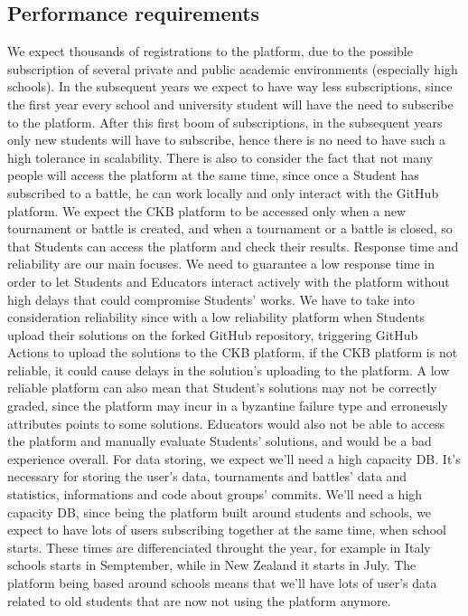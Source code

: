 \documentclass{article}
\begin{document}
{\subsection{Performance requirements}
We expect thousands of registrations to the platform, due to the possible
subscription of several private and public academic environments (especially high schools).
In the subsequent years we expect to have way less subscriptions, since the first year every school and university student
will have the need to subscribe to the platform.
After this first boom of subscriptions, in the subsequent years only new students will have to subscribe, hence there is no need to 
have such a high tolerance in scalability.
There is also to consider the fact that not many people will access the platform at the same time, since once a Student has subscribed 
to a battle, he can work locally and only interact with the GitHub platform.
We expect the CKB platform to be accessed only when a new tournament or battle is created, and when a tournament or a battle is closed,
so that Students can access the platform and check their results. Response time and reliability are our main focuses.
We need to guarantee a low response time in order to let Students and Educators interact actively with the platform
without high delays that could compromise Students' works.
We have to take into consideration reliability since with a low reliability platform when Students upload their solutions on the
forked GitHub repository, triggering GitHub Actions to upload the solutions to the CKB platform, if the CKB platform is not reliable,
it could cause delays in the solution's uploading to the platform.
A low reliable platform can also mean that Student's solutions may not be correctly graded, since the platform may incur in a byzantine failure
type and erroneusly attributes points to some solutions.
Educators would also not be able to access the platform and manually evaluate Students' solutions, and would be a bad experience overall.
For data storing, we expect we'll need a high capacity DB. It's necessary for storing
the user's data, tournaments and battles' data and statistics, informations and code about groups' commits.
We'll need a high capacity DB, since being the platform built around students and schools, we expect to have lots of users subscribing together
at the same time, when school starts. These times are differenciated throught the year, for example in Italy schools starts in Semptember, while in
New Zealand it starts in July. The platform being based around schools means that we'll have lots of user's data related to old students that are
 now not using the platform anymore.
}
\end{document}
